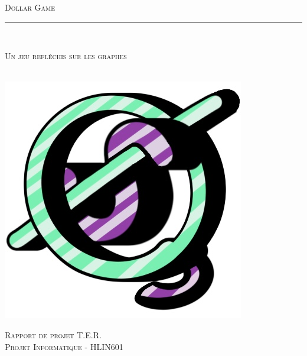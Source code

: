 \documentclass[twoside]{report}
\begin{document}
\begin{titlepage}
\Montserrat

\begin{center}
\textsc{\Huge{Dollar Game}}\\

\vspace*{0.3cm}
\rule{2cm}{0.1pt}\\
\vspace*{0.3cm}

\textsc{\LARGE{Un jeu refléchis sur les graphes\\}}

\vspace{0.8cm}\\
\vspace{0.2cm}
\includegraphics[scale=0.3]{DGLogo.jpg}\\
\vspace{0.2cm}

\vspace{1cm}
\textsc{\Large{Rapport de projet T.E.R.}}\\
\vspace{0.2cm}
\textsc{\Large{Projet Informatique - HLIN601}} 
\end{center}


\end{titlepage}
\end{document}
